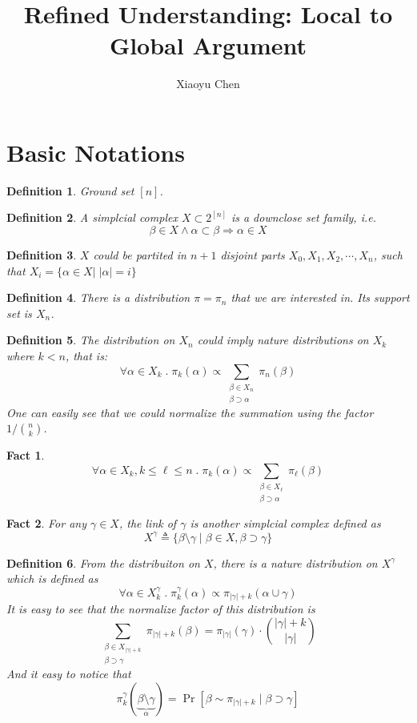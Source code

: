 \documentclass{article}
\title{Refined Understanding: Local to Global Argument}
\author{Xiaoyu Chen}
\date{}
\newtheorem{define}{Definition}[section]
\newtheorem{fact}{Fact}[section]
\begin{document}
\maketitle
\section{Basic Notations}

\begin{define}
  Ground set $[n]$.
\end{define}

\begin{define}
  A simplcial complex $X \subset 2^{[n]}$ is a downclose set family, i.e.
  \[\beta \in X \land \alpha \subset \beta \Rightarrow \alpha\in X\]
\end{define}

\begin{define}
  $X$ could be partited in $n+1$ disjoint parts $X_0, X_1, X_2, \cdots, X_n$, such that
  $X_i = \{\alpha\in X |\; |\alpha| = i\}$
\end{define}

\begin{define}
  There is a distribution $\pi = \pi_n$ that we are interested in.
  Its support set is $X_n$.
\end{define}

\begin{define}
  The distribution on $X_n$ could imply nature distributions on $X_k$ where $k < n$, that is:
  \[\forall \alpha\in X_k \;.\; \pi_k(\alpha) \propto \sum_{\substack{\beta\in X_n \\ \beta\supset \alpha}} \pi_n(\beta)\]
  One can easily see that we could normalize the summation using the factor $1/\binom{n}{k}$.
\end{define}

\begin{fact}
  \[\forall \alpha\in X_k, k \leq \ell\leq n \;.\; \pi_k(\alpha) \propto \sum_{\substack{\beta\in X_\ell\\ \beta\supset \alpha}} \pi_\ell(\beta)\]
\end{fact}

\begin{fact}
  For any $\gamma \in X$, the link of $\gamma$ is another simplcial complex defined as
  \[X^\gamma \triangleq \{\beta\setminus \gamma \;|\; \beta\in X, \beta\supset \gamma\}\]
\end{fact}

\begin{define}
  From the distribuiton on $X$, there is a nature distribution on $X^\gamma$ which is defined as
  \[\forall \alpha \in X^\gamma_k \;.\; \pi^\gamma_k(\alpha) \propto \pi_{|\gamma|+k}(\alpha \cup \gamma)\]
  It is easy to see that the normalize factor of this distribution is
  \[\sum_{\substack{\beta\in X_{|\gamma| + k} \\ \beta \supset \gamma}} \pi_{|\gamma|+k}(\beta) = \pi_{|\gamma|}(\gamma) \cdot \binom{|\gamma| + k}{|\gamma|}\]
  And it easy to notice that
  \[\pi^\gamma_k(\underbrace{\beta\setminus\gamma}_{\alpha}) = \Pr[\beta\sim \pi_{|\gamma| + k} \;|\; \beta \supset \gamma]\]
\end{define}
\end{document}
